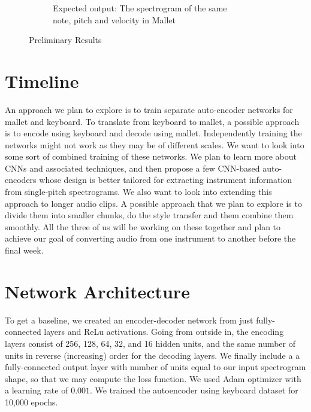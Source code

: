 \documentclass{article}
\begin{document}
\begin{figure}[h]
\begin{subfigure}{.5\textwidth}
  \caption{Expected output: The spectrogram of the same\\ note, pitch and velocity in Mallet}
  \label{fig:sfig2}
\end{subfigure}
\caption{Preliminary Results}
\label{fig:results}
\end{figure}

\section{Timeline}
An approach we plan to explore is to train separate auto-encoder networks for mallet and keyboard. To translate from keyboard to mallet, a possible approach is to encode using keyboard and decode using mallet. Independently training the networks might not work as they may be of different scales. We want to look into some sort of combined training of these networks. 
We plan to learn more about CNNs and associated techniques, and then propose a few CNN-based auto-encoders whose design is better tailored for extracting instrument information from single-pitch spectrograms. 
We also want to look into extending this approach to longer audio clips. A possible approach that we plan to explore is to divide them into smaller chunks, do the style transfer and them combine them smoothly. 
All the three of us will be working on these together and plan to achieve our goal of converting audio from one instrument to another before the final week.

\pagebreak




\appendix

\section{Network Architecture}

To get a baseline, we created an encoder-decoder network from just fully-connected layers and ReLu activations.  Going from outside in, the encoding layers consist of 256, 128, 64, 32, and 16 hidden units, and the same number of units in reverse (increasing) order for the decoding layers. We finally include a a fully-connected output layer with number of units equal to our input spectrogram shape, so that we may compute the loss function. We used Adam optimizer with a learning rate of $0.001$. We trained the autoencoder using keyboard dataset for 10,000 epochs.
\end{document}
